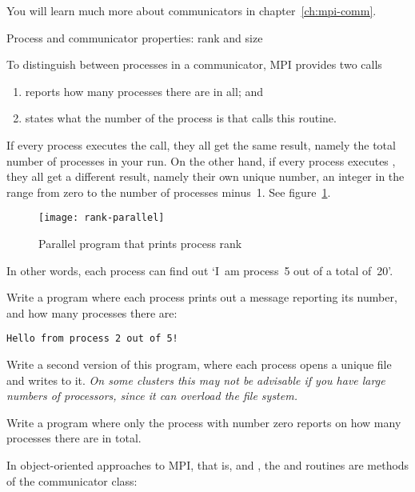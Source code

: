 You will
learn much more about communicators in chapter~\ref{ch:mpi-comm}.

 {Process and communicator properties: rank and size}

To distinguish between processes in a communicator, MPI provides two calls
\begin{enumerate}
\item {} reports how many processes there are in all; and
\item {} states what the number of the
  process is that calls this routine.
\end{enumerate}

If every process executes the  call, they all get the
same result, namely the total number of processes in your run.
%
On the
other hand, if every process executes , they all get
a different result, namely their own unique number, an integer in the
range from zero to the number of processes minus~1.
See figure~\ref{fig:rank-parallel}.
%
\begin{figure}[ht]
  \texttt{[image: rank-parallel]}
  \caption{Parallel program that prints process rank}
  \label{fig:rank-parallel}
\end{figure}
%
In other words, each process can find out `I~am process~5
out of a total of~20'.


\begin{exercise}
  \label{ex:hello3}
  Write a program where each process prints out a message
  reporting its number, and how many processes there are:
\begin{verbatim}
Hello from process 2 out of 5!
\end{verbatim}

  Write a second version of this program, where each process opens a
  unique file and writes to it. \emph{On some clusters this may not be
    advisable if you have large numbers of processors, since it can
    overload the file system.}
\end{exercise}

\begin{exercise}
  \label{ex:hello4}
  Write a program where only the process with number zero
  reports on how many processes there are in total.
\end{exercise}

In object-oriented approaches to MPI, that is,  and ,
the  and 
routines are methods of the communicator class:


